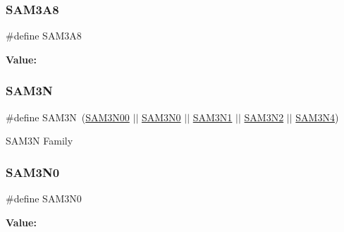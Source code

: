 \subsubsection{\texorpdfstring{SAM3A8}{SAM3A8}}
{\footnotesize\ttfamily \#define S\+A\+M3\+A8}

{\bfseries Value\+:}
\begin{DoxyCode}{0}
\DoxyCodeLine{( \(\backslash\)}
\DoxyCodeLine{        )}

\end{DoxyCode}
\mbox{\label{group__sam__part__macros__group_ga52239420b96aa3f1a273665cfd3b60a1}} 
\subsubsection{\texorpdfstring{SAM3N}{SAM3N}}
{\footnotesize\ttfamily \#define S\+A\+M3N~(\mbox{\hyperlink{group__sam__part__macros__group_gab650d285e2a8ff0d85b3522c87a4cfc6}{S\+A\+M3\+N00}} $\vert$$\vert$ \mbox{\hyperlink{group__sam__part__macros__group_ga6a5ed34ed428558ee2bb94af5ae516d6}{S\+A\+M3\+N0}} $\vert$$\vert$ \mbox{\hyperlink{group__sam__part__macros__group_gaf58a7d141f31d6db97223dfd62d92905}{S\+A\+M3\+N1}} $\vert$$\vert$ \mbox{\hyperlink{group__sam__part__macros__group_ga96514eddac4935925994ef85ca9d12ac}{S\+A\+M3\+N2}} $\vert$$\vert$ \mbox{\hyperlink{group__sam__part__macros__group_ga1d47bffd90ddbb0dac3874edbafb3803}{S\+A\+M3\+N4}})}

S\+A\+M3N Family \mbox{\label{group__sam__part__macros__group_ga6a5ed34ed428558ee2bb94af5ae516d6}} 
\subsubsection{\texorpdfstring{SAM3N0}{SAM3N0}}
{\footnotesize\ttfamily \#define S\+A\+M3\+N0}

{\bfseries Value\+:}
\begin{DoxyCode}{0}
\DoxyCodeLine{( \(\backslash\)}
\DoxyCodeLine{        )}

\end{DoxyCode}
\mbox{\label{group__sam__part__macros__group_gab650d285e2a8ff0d85b3522c87a4cfc6}} 
